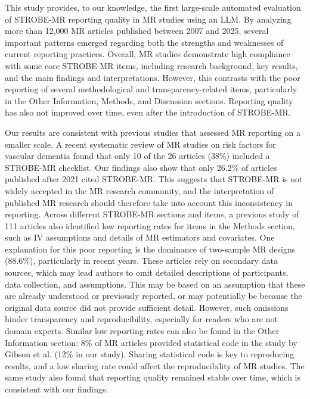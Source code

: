 


This study provides, to our knowledge, the first large-scale automated evaluation of STROBE-MR reporting quality in MR studies using an LLM. By analyzing more than 12,000 MR articles published between 2007 and 2025, several important patterns emerged regarding both the strengths and weaknesses of current reporting practices. Overall, MR studies demonstrate high compliance with some core STROBE-MR items, including research background, key results, and the main findings and interpretations. However, this contrasts with the poor reporting of several methodological and transparency-related items, particularly in the Other Information, Methods, and Discussion sections. Reporting quality has also not improved over time, even after the introduction of STROBE-MR.

Our results are consistent with previous studies that assessed MR reporting on a smaller scale. A recent systematic review \cite{zuo_systematic_2026} of MR studies on risk factors for vascular dementia found that only 10 of the 26 articles (38\%) included a STROBE-MR checklist. Our findings also show that only 26.2\% of articles published after 2021 cited STROBE-MR. This suggests that STROBE-MR is not widely accepted in the MR research community, and the interpretation of published MR research should therefore take into account this inconsistency in reporting. Across different STROBE-MR sections and items, a previous study \cite{gibson_reporting_2023} of 111 articles also identified low reporting rates for items in the Methods section, such as IV assumptions and details of MR estimators and covariates. One explanation for this poor reporting is the dominance of two-sample MR designs (88.6\%), particularly in recent years. These articles rely on secondary data sources, which may lead authors to omit detailed descriptions of participants, data collection, and assumptions. This may be based on an assumption that these are already understood or previously reported, or may potentially be because the original data source did not provide sufficient detail. However, such omissions hinder transparency and reproducibility, especially for readers who are not domain experts. Similar low reporting rates can also be found in the Other Information section: 8\% of MR articles provided statistical code in the study by Gibson et al. (12\% in our study). Sharing statistical code is key to reproducing results, and a low sharing rate could affect the reproducibility of MR studies. The same study also found that reporting quality remained stable over time, which is consistent with our findings.

